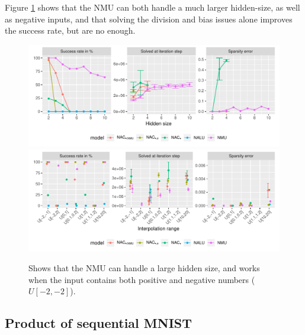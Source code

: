 Figure \ref{fig:simple-function-static-theoreical-claims-experiment} shows that the NMU can both handle a much larger hidden-size, as well as negative inputs, and that solving the division and bias issues alone improves the success rate, but are no enough.

\begin{figure}[h]
\centering
\includegraphics[width=\linewidth,trim={0 1.3cm 0 0},clip]{results/simple_function_static_mul_hidden_size.pdf}
\includegraphics[width=\linewidth,trim={0 0 0 0.809cm},clip]{results/simple_function_static_mul_range.pdf}
\caption{Shows that the NMU can handle a large hidden size, and works when the input contains both positive and negative numbers ($U[-2,-2]$).} 
\label{fig:simple-function-static-theoreical-claims-experiment}
\end{figure}

\subsection{Product of sequential MNIST}


